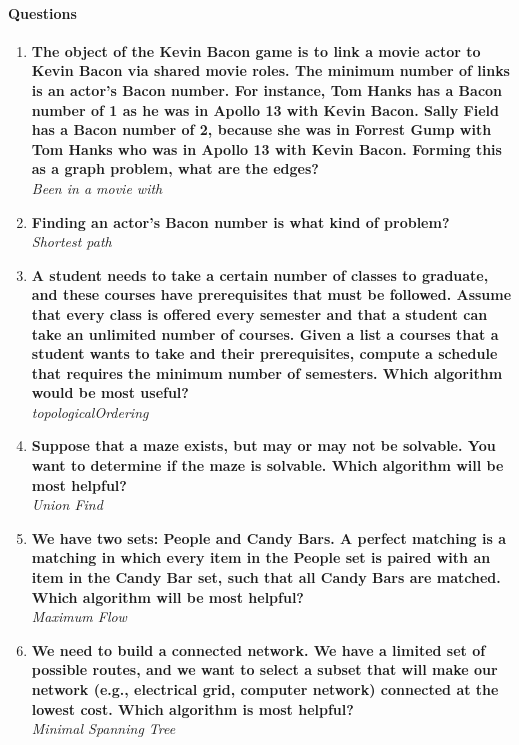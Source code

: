 \documentclass[10pt]{article}
\begin{document}
\paragraph{Questions}
\begin{enumerate}
    \item \textbf{The object of the Kevin Bacon game is to link a movie actor to Kevin Bacon via shared movie roles.  The minimum number of links is an actor's Bacon number.  For instance, Tom Hanks has a Bacon number of 1 as he was in Apollo 13 with Kevin Bacon.  Sally Field has a Bacon number of 2, because she was in Forrest Gump with Tom Hanks who was in Apollo 13 with Kevin Bacon. Forming this as a graph problem, what are the edges?}\\
          \textit{ Been in a movie with }
    \item \textbf{Finding an actor's Bacon number is what kind of problem?}\\\textit{Shortest path}
    \item \textbf{A student needs to take a certain number of classes to graduate, and these courses have prerequisites that must be followed.  Assume that every class is offered every semester and that a student can take an unlimited number of courses.  Given a list a courses that a student wants to take and their prerequisites, compute a schedule that requires the minimum number of semesters. Which algorithm would be most useful?}\\
          \textit{topologicalOrdering}
    \item \textbf{Suppose that a maze exists, but may or may not be solvable.  You want to determine if the maze is solvable. Which algorithm will be most helpful?}\\ \textit{Union Find}
    \item \textbf{We have two sets: People and Candy Bars.  A perfect matching is a matching in which every item in the People set is paired with an item in the Candy Bar set, such that all Candy Bars are matched. Which algorithm will be most helpful?} \\
          \textit{Maximum Flow}
    \item \textbf{We need to build a connected network.  We have a limited set of possible routes, and we want to select a subset that will make our network (e.g., electrical grid, computer network)  connected at the lowest cost. Which algorithm is most helpful?}\\ \textit{Minimal Spanning Tree }
\end{enumerate}
\end{document}
